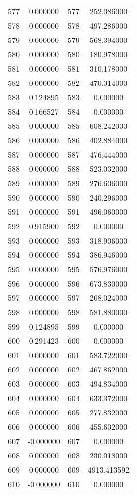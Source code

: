 \documentclass[12pt]{article}
\begin{document}
\begin{longtable}{@{}cccc@{}}
577 & 0.000000 & 577 & 252.086000 \\
578 & 0.000000 & 578 & 497.286000 \\
579 & 0.000000 & 579 & 568.394000 \\
580 & 0.000000 & 580 & 180.978000 \\
581 & 0.000000 & 581 & 310.178000 \\
582 & 0.000000 & 582 & 470.314000 \\
583 & 0.124895 & 583 & 0.000000 \\
584 & 0.166527 & 584 & 0.000000 \\
585 & 0.000000 & 585 & 608.242000 \\
586 & 0.000000 & 586 & 402.884000 \\
587 & 0.000000 & 587 & 476.444000 \\
588 & 0.000000 & 588 & 523.032000 \\
589 & 0.000000 & 589 & 276.606000 \\
590 & 0.000000 & 590 & 240.296000 \\
591 & 0.000000 & 591 & 496.060000 \\
592 & 0.915900 & 592 & 0.000000 \\
593 & 0.000000 & 593 & 318.906000 \\
594 & 0.000000 & 594 & 386.946000 \\
595 & 0.000000 & 595 & 576.976000 \\
596 & 0.000000 & 596 & 673.830000 \\
597 & 0.000000 & 597 & 268.024000 \\
598 & 0.000000 & 598 & 581.880000 \\
599 & 0.124895 & 599 & 0.000000 \\
600 & 0.291423 & 600 & 0.000000 \\
601 & 0.000000 & 601 & 583.722000 \\
602 & 0.000000 & 602 & 467.862000 \\
603 & 0.000000 & 603 & 494.834000 \\
604 & 0.000000 & 604 & 633.372000 \\
605 & 0.000000 & 605 & 277.832000 \\
606 & 0.000000 & 606 & 455.602000 \\
607 & -0.000000 & 607 & 0.000000 \\
608 & 0.000000 & 608 & 230.018000 \\
609 & 0.000000 & 609 & 4913.413592 \\
610 & -0.000000 & 610 & 0.000000 \\

\end{longtable}
\end{document}
